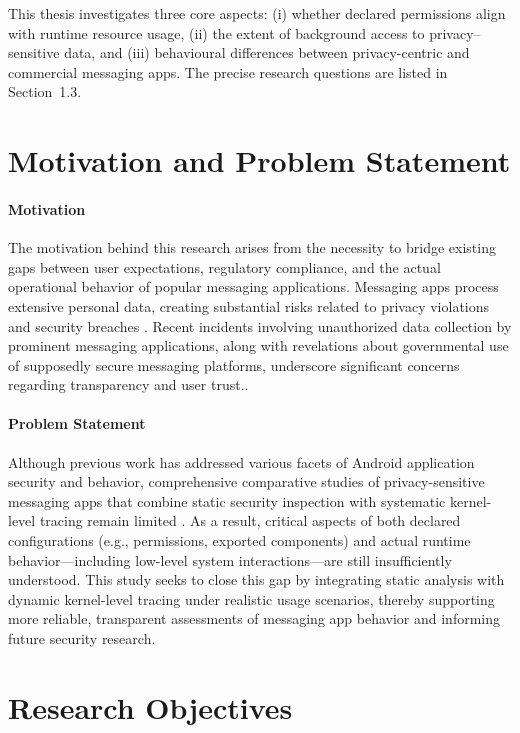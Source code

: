 \documentclass[a4paper,12pt]{report}
\begin{document}
This thesis investigates three core aspects:
(i) whether declared permissions align with runtime resource usage,
(ii) the extent of background access to privacy–sensitive data, and
(iii) behavioural differences between privacy-centric and commercial messaging apps.
The precise research questions are listed in Section~1.3.

\section{Motivation and Problem Statement}

\paragraph{Motivation}
The motivation behind this research arises from the necessity to bridge existing
gaps between user expectations, regulatory compliance, and the actual operational
behavior of popular messaging applications. Messaging apps process extensive personal
data, creating substantial risks related to privacy violations and security breaches \cite{ArsTechnica2018}.
Recent incidents involving unauthorized data collection by prominent messaging
applications, along with revelations about governmental use of supposedly secure
messaging platforms, underscore significant concerns regarding transparency
and user trust.\cite{ArsTechnica2018, Reuters2021WhatsAppExodus, Politico2025Signal}.

\paragraph{Problem Statement}


Although previous work has addressed various facets of Android application security and behavior, comprehensive comparative studies of privacy-sensitive messaging apps that combine static security inspection with systematic kernel-level tracing remain limited \cite{DynamicSecurityAnalysis2023}. As a result, critical aspects of both declared configurations (e.g., permissions, exported components) and actual runtime behavior—including low-level system interactions—are still insufficiently understood. This study seeks to close this gap by integrating static analysis with dynamic kernel-level tracing under realistic usage scenarios, thereby supporting more reliable, transparent assessments of messaging app behavior and informing future security research.
\section{Research Objectives}
\end{document}
